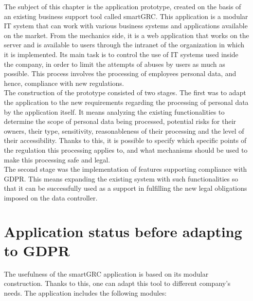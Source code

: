 \documentclass[en, noamssymb]{mgr}
\begin{document}
The subject of this chapter is the application prototype, created on the basis of an existing business support tool called smartGRC. This application is a modular IT system that can work with various business systems and applications available on the market. From the mechanics side, it is a web application that works on the server and is available to users through the intranet of the organization in which it is implemented. Its main task is to control the use of IT systems used inside the company, in order to limit the attempts of abuses by users as much as possible. This process involves the processing of employees personal data, and hence, compliance with new regulations.\\
\indent The construction of the prototype consisted of two stages. The first was to adapt the application to the new requirements regarding the processing of personal data by the application itself. It means analyzing the existing functionalities to determine the scope of personal data being processed, potential risks for their owners, their type, sensitivity, reasonableness of their processing and the level of their accessibility. Thanks to this, it is possible to specify which specific points of the regulation this processing applies to, and what mechanisms should be used to make this processing safe and legal.\\
\indent The second stage was the implementation of features supporting compliance with GDPR. This means expanding the existing system with such functionalities so that it can be successfully used as a support in fulfilling the new legal obligations imposed on the data controller.

\section{Application status before adapting to GDPR}

The usefulness of the smartGRC application is based on its modular construction. Thanks to this, one can adapt this tool to different company's needs. The application includes the following modules:
\end{document}
